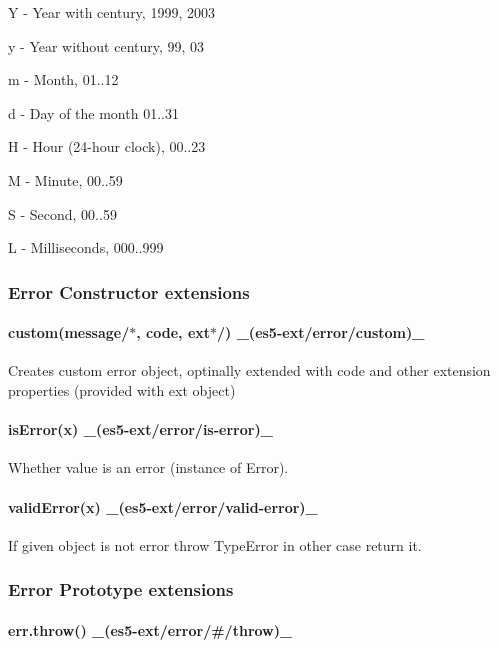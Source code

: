 \begin{DoxyItemize}
\item {\ttfamily Y} -\/ Year with century, 1999, 2003
\item {\ttfamily y} -\/ Year without century, 99, 03
\item {\ttfamily m} -\/ Month, 01..12
\item {\ttfamily d} -\/ Day of the month 01..31
\item {\ttfamily H} -\/ Hour (24-\/hour clock), 00..23
\item {\ttfamily M} -\/ Minute, 00..59
\item {\ttfamily S} -\/ Second, 00..59
\item {\ttfamily L} -\/ Milliseconds, 000..999
\end{DoxyItemize}

\subsubsection*{Error Constructor extensions}

\paragraph*{custom(message/$\ast$, code, ext$\ast$/) \+\_\+(es5-\/ext/error/custom)\+\_\+}

Creates custom error object, optinally extended with {\ttfamily code} and other extension properties (provided with {\ttfamily ext} object) ~\newline
 \paragraph*{is\+Error(x) \+\_\+(es5-\/ext/error/is-\/error)\+\_\+}

Whether value is an error (instance of {\ttfamily Error}). ~\newline
 \paragraph*{valid\+Error(x) \+\_\+(es5-\/ext/error/valid-\/error)\+\_\+}

If given object is not error throw Type\+Error in other case return it.

\subsubsection*{Error Prototype extensions}

\paragraph*{err.\+throw() \+\_\+(es5-\/ext/error/\#/throw)\+\_\+}

